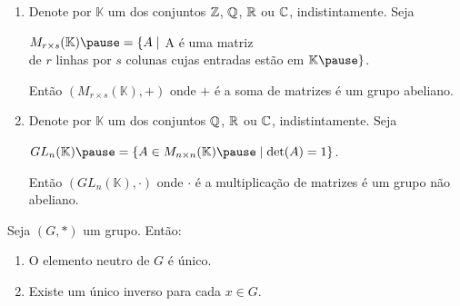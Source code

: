 \documentclass{beamer}
\begin{document}
    \begin{frame}
        \begin{exemplos}
            \begin{enumerate}[label={\arabic*})]
                \conti

                \item Denote por $\mathbb{K}$ \pause um dos conjuntos $\mathbb{Z}$, \pause $\mathbb{Q}$, \pause $\mathbb{R}$ \pause ou $\mathbb{C}$, \pause indistintamente. Seja \pause
                \begin{center}
                    $M_{r \times s}(\mathbb{K}) \pause = \{A \mid $ A \'e uma matriz \pause \\de $r$ linhas \pause por $s$ \pause colunas cujas entradas est\~ao em $\mathbb{K} \pause\}$.
                \end{center}
                Ent\~ao $(M_{r \times s}(\mathbb{K}), +)$ \pause onde $+$ \'e a soma de matrizes \pause \'e um grupo abeliano. \pause

                \vspace{.3cm}

                \item Denote por $\mathbb{K}$ \pause um dos conjuntos $\mathbb{Q}$, \pause $\mathbb{R}$ \pause ou $\mathbb{C}$, \pause indistintamente. Seja \pause
                \begin{center}
                    $GL_n(\mathbb{K}) \pause = \{A \in M_{n \times n}(\mathbb{K}) \pause \mid \det(A) = 1\}$. \pause
                \end{center}
                Ent\~ao $(GL_n(\mathbb{K}), \cdot)$ \pause onde $\cdot$ \'e a multiplica\c{c}\~ao de matrizes \'e um grupo \pause n\~ao abeliano. \pause
            \end{enumerate}
        \end{exemplos}
    \end{frame}

    \begin{frame}
        \begin{proposicao}
            Seja $(G,*)$ um grupo. \pause Ent\~ao:\pause
            \begin{enumerate}[label={\roman*})]
                \item O elemento neutro de $G$ {\'e} {\'u}nico.\pause

                \vspace{.3cm}

                \item Existe um {\'u}nico inverso para cada $x \in G$.\pause

                \seti
            \end{enumerate}
        \end{proposicao}
    \end{frame}
\end{document}
